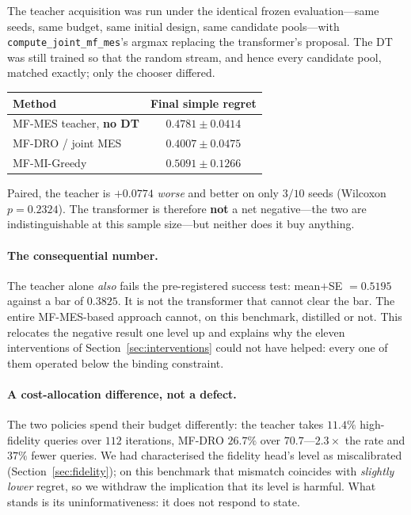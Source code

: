 \documentclass[11pt]{article}
\begin{document}
The teacher acquisition was run under the identical frozen evaluation---same
seeds, same budget, same initial design, same candidate pools---with
\texttt{compute\_joint\_mf\_mes}'s argmax replacing the transformer's proposal.
The DT was still trained so that the random stream, and hence every candidate
pool, matched exactly; only the chooser differed.

\begin{center}
\begin{tabular}{lc}
\toprule
Method & Final simple regret \\
\midrule
MF-MES teacher, \textbf{no DT} & $0.4781 \pm 0.0414$ \\
MF-DRO / joint MES & $\mathbf{0.4007 \pm 0.0475}$ \\
MF-MI-Greedy & $0.5091 \pm 0.1266$ \\
\bottomrule
\end{tabular}
\end{center}

Paired, the teacher is $+0.0774$ \emph{worse} and better on only $3/10$ seeds
(Wilcoxon $p = 0.2324$). The transformer is therefore \textbf{not} a net
negative---the two are indistinguishable at this sample size---but neither does
it buy anything.

\paragraph{The consequential number.} The teacher alone \emph{also} fails the
pre-registered success test: mean${+}$SE $= 0.5195$ against a bar of $0.3825$.
It is not the transformer that cannot clear the bar. The entire MF-MES-based
approach cannot, on this benchmark, distilled or not. This relocates the
negative result one level up and explains why the eleven interventions of
Section~\ref{sec:interventions} could not have helped: every one of them
operated below the binding constraint.

\paragraph{A cost-allocation difference, not a defect.} The two policies spend
their budget differently: the teacher takes $11.4\%$ high-fidelity queries over
$112$ iterations, MF-DRO $26.7\%$ over $70.7$---$2.3\times$ the rate and $37\%$
fewer queries. We had characterised the fidelity head's level as miscalibrated
(Section~\ref{sec:fidelity}); on this benchmark that mismatch coincides with
\emph{slightly lower} regret, so we withdraw the implication that its level is
harmful. What stands is its uninformativeness: it does not respond to state.
\end{document}
